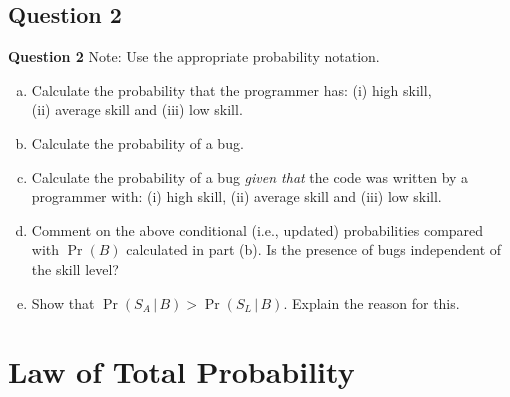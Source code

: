 \documentclass[compress]{beamer}        %
\makeatletter
\newcommand{\tcb}{\textcolor{beamer@blendedblue}}
\makeatother
\begin{document}
\subsection{Question 2}
\begin{frame}{\bf \tcb{Question 2}}
Note: Use the appropriate probability notation.\\[0.3cm]
\begin{enumerate}[a)]\itemsep0.3cm
\item Calculate the probability that the programmer has: (i) high skill, \\(ii) average skill and (iii) low skill.
\item Calculate the probability of a bug.
\item Calculate the probability of a bug \emph{given that} the code was written by a programmer with: (i) high skill, (ii) average skill and (iii) low skill.
\item Comment on the above conditional (i.e., updated) probabilities compared with $\Pr(B)$ calculated in part (b). Is the presence of bugs independent of the skill level?
\item Show that $\Pr(S_A\,|\,B) > \Pr(S_L\,|\,B)$. Explain the reason for this.
\end{enumerate}


\end{frame}








\section{Law of Total Probability}
\end{document}

